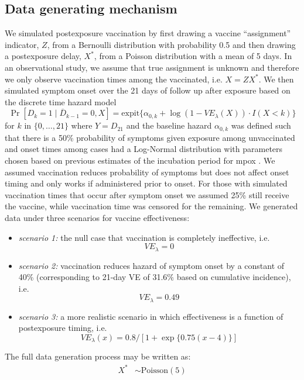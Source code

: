 \begin{appendices}
\begin{refsection}
    \subsection{Data generating mechanism}
    We simulated postexposure vaccination by first drawing a vaccine ``assignment'' indicator, $Z$, from a Bernoulli distribution with probability 0.5 and then drawing a postexposure delay, $X^*$, from a Poisson distribution with a mean of 5 days. In an observational study, we assume that true assignment is unknown and therefore we only observe vaccination times among the vaccinated, i.e. $X = ZX^* $. We then simulated symptom onset over the 21 days of follow up after exposure based on the discrete time hazard model 
    $$\Pr[D_k = 1 \mid \overline{D}_{k-1} = 0, X] =  \text{expit}\{\alpha_{0,k} + \log(1 - VE_{\lambda}(X)) \cdot I(X < k)\}$$
    for $k$ in $\{0, \ldots, 21\}$ where $Y = D_{21}$ and the baseline hazard $\alpha_{0,k}$ was defined such that there is a 50\% probability of symptoms given exposure among unvaccinated and onset times among cases had a Log-Normal distribution with parameters chosen based on previous estimates of the incubation period for mpox \cite{miura_estimated_2022}. We assumed vaccination reduces probability of symptoms but does not affect onset timing and only works if administered prior to onset. For those with simulated vaccination times that occur after symptom onset we assumed 25\% still receive the vaccine, while vaccination time was censored for the remaining. We generated data under three scenarios for vaccine effectiveness: 
    \begin{itemize}
        \item \textit{scenario 1:} the null case that vaccination is completely ineffective, i.e.
        $$VE_{\lambda} = 0$$
        \item \textit{scenario 2:} vaccination reduces hazard of symptom onset by a constant of 40\% (corresponding to 21-day VE of 31.6\% based on cumulative incidence), i.e. 
        $$VE_{\lambda} = 0.49$$
        \item \textit{scenario 3:} a more realistic scenario in which effectiveness is a function of postexposure timing, i.e.
        $$VE_{\lambda}(x) = 0.8/[1+\exp\{0.75(x-4)\}]$$
    \end{itemize}
    The full data generation process may be written as:
    \begin{align*}
        X^* & \sim \text{Poisson}(5) \\

\end{align*}
\end{refsection}
\end{appendices}
